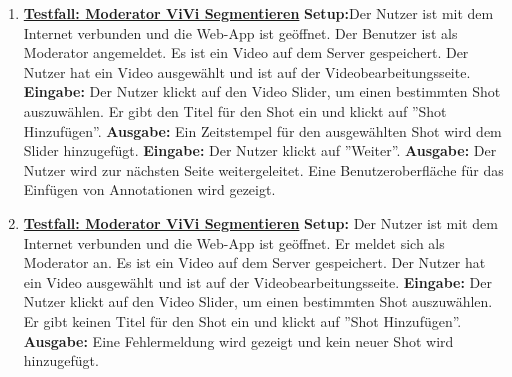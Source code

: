 \begin{enumerate}
	\item \underline{\textbf{Testfall: Moderator ViVi Segmentieren}} \linebreak
	\textbf{Setup:}Der Nutzer ist mit dem Internet verbunden und die Web-App ist geöffnet. Der Benutzer ist als Moderator angemeldet. Es ist ein Video auf dem Server gespeichert. Der Nutzer hat ein Video ausgewählt und ist auf der Videobearbeitungsseite.\linebreak
	\textbf{Eingabe:} Der Nutzer klickt auf den Video Slider, um einen bestimmten Shot auszuwählen. Er gibt den Titel für den Shot ein und klickt auf ''Shot Hinzufügen''. \linebreak
	\textbf{Ausgabe:} Ein Zeitstempel für den ausgewählten Shot wird dem Slider hinzugefügt.\linebreak
	\textbf{Eingabe:} Der Nutzer klickt auf ''Weiter''. \linebreak
	\textbf{Ausgabe:} Der Nutzer wird zur nächsten Seite weitergeleitet. Eine Benutzeroberfläche für das Einfügen von Annotationen wird gezeigt.
	
	\item \underline{\textbf{Testfall: Moderator ViVi Segmentieren}} \linebreak
	\textbf{Setup:} Der Nutzer ist mit dem Internet verbunden und die Web-App ist geöffnet. Er meldet sich als Moderator an. Es ist ein Video auf dem Server gespeichert. Der Nutzer hat ein Video ausgewählt und ist auf der Videobearbeitungsseite.\linebreak
	\textbf{Eingabe:} Der Nutzer klickt auf den Video Slider, um einen bestimmten Shot auszuwählen. Er gibt keinen Titel für den Shot ein und klickt auf ''Shot Hinzufügen''. \linebreak
	\textbf{Ausgabe:} Eine Fehlermeldung wird gezeigt und kein neuer Shot wird hinzugefügt.
	
	

\end{enumerate}
